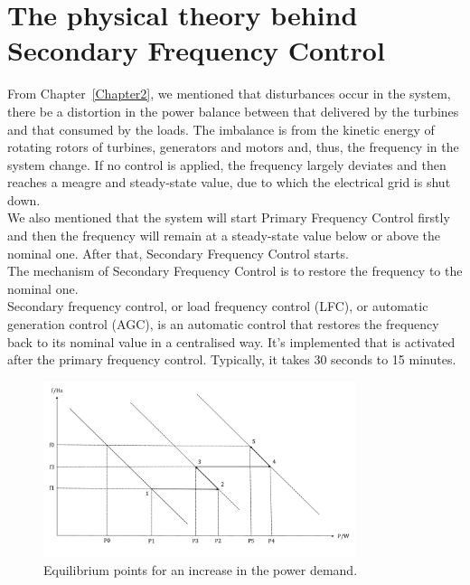 \section{The physical theory behind Secondary Frequency Control} %
From Chapter~\ref{Chapter2}, we mentioned that disturbances occur in the system, there be a distortion in the power balance between that delivered by the turbines and that consumed by the loads. The imbalance is from the kinetic energy of rotating rotors of turbines, generators and motors and, thus, the frequency in the system change. If no control is applied, the frequency largely deviates and then reaches a meagre and steady-state value, due to which the electrical grid is shut down. \\

We also mentioned that the system will start Primary Frequency Control firstly and then the frequency will remain at a steady-state value below or above the nominal one. After that, Secondary Frequency Control starts.\\

The mechanism of Secondary Frequency Control is to restore the frequency to the nominal one.\\

Secondary frequency control, or load frequency control (LFC), or automatic generation control (AGC), is an automatic control that restores the frequency back to its nominal value in a centralised way. It's implemented that is activated after the primary frequency control. Typically, it takes 30 seconds to 15 minutes.\\

\begin{figure}[htbp]
\centering
\includegraphics[width = 0.816\textwidth]{figure/3_1_Equilibrium.pdf}
\caption{Equilibrium points for an increase in the power demand.}
\label{3_1_Equilibrium}
\end{figure}

